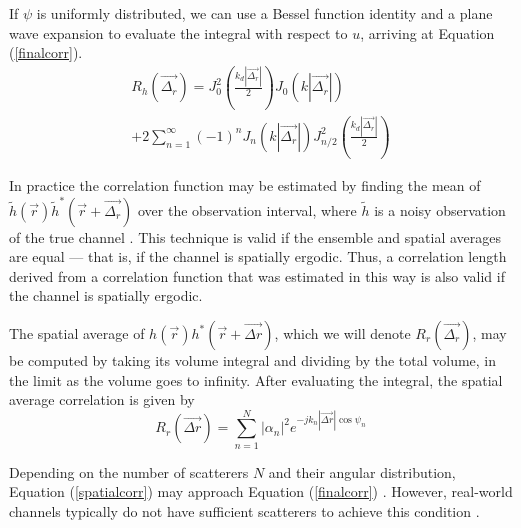 \documentclass[conference]{ieeetran}
\begin{document}
If $\psi$ is uniformly distributed, we can use a Bessel function identity \cite{gradshteyn2007} and a plane wave expansion to evaluate the integral with respect to $u$, arriving at Equation (\ref{finalcorr}).
\begin{multline}\label{finalcorr}
R_h(\vec{\Delta_r}) = J_0^2(\frac{k_d |\vec{\Delta_r}|}{2})J_0(k|\vec{\Delta_r}|)\\ + 2\sum_{n=1}^{\infty}(-1)^n J_n(k|\vec{\Delta_r}|)J_{n/2}^2(\frac{k_d |\vec{\Delta_r}|}{2})
\end{multline}

In practice the correlation function may be estimated by finding the mean of $\tilde{h}(\vec{r})\tilde{h}^*(\vec{r}+\vec{\Delta_r})$ over the observation interval, where $\tilde{h}$ is a noisy observation of the true channel  . This technique is valid if the ensemble and spatial averages are equal --- that is, if the channel is spatially ergodic.  Thus, a correlation length derived from a correlation function that was estimated in this way is also valid if the channel is spatially ergodic.

The spatial average of $h(\vec{r})h^*(\vec{r}+\vec{\Delta r})$, which we will denote $R_r(\vec{\Delta_r})$, may be computed by taking its volume integral and dividing by the total volume, in the limit as the volume goes to infinity.
After evaluating the integral, the spatial average correlation is given by 
\begin{equation}\label{spatialcorr}
R_r(\vec{\Delta r}) =  \sum_{n=1}^N |\alpha_n|^2 e^{-jk_n|\vec{\Delta r}|\cos \psi_n}
\end{equation}

Depending on the number of scatterers $N$ and their angular distribution, Equation (\ref{spatialcorr}) may approach Equation (\ref{finalcorr}) \cite{isukapalli2006}.  However, real-world channels typically do not have sufficient scatterers to achieve this condition \cite{duel-hallen2000}.  
\end{document}

